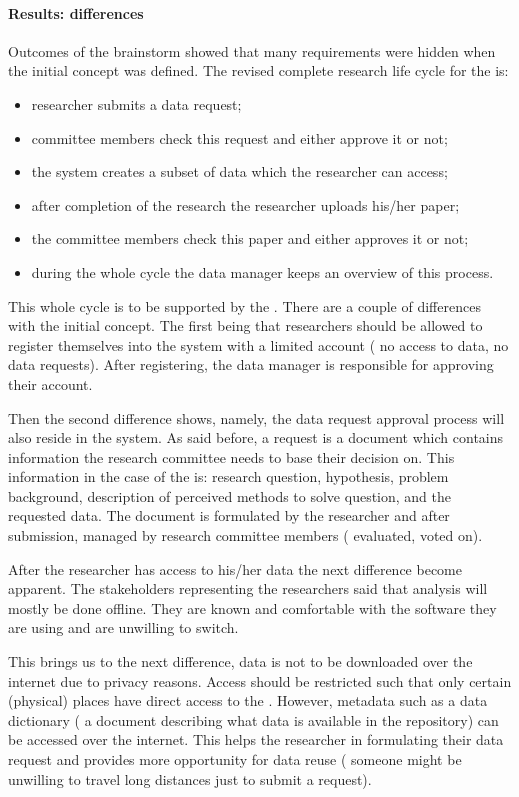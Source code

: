 \paragraph{Results: differences}
Outcomes of the brainstorm showed that many requirements were hidden when the initial concept was defined.
The revised complete research life cycle for the \project{} is:
\begin{itemize}
	\item researcher submits a data request;
	\item committee members check this request and either approve it or not;
	\item the system creates a subset of data which the researcher can access;
	\item after completion of the research the researcher uploads his/her paper;
	\item the committee members check this paper and either approves it or not;
	\item during the whole cycle the data manager keeps an overview of this process.
\end{itemize}

This whole cycle is to be supported by the \ivfsystem{}.
There are a couple of differences with the initial concept.
The first being that researchers should be allowed to register themselves into the system with a limited account (\ie{} no access to data, no data requests).
After registering, the data manager is responsible for approving their account.

Then the second difference shows, namely, the data request approval process will also reside in the system.
As said before, a request is a document which contains information the research committee needs to base their decision on.
This information in the case of the \ivfsystem{} is: research question, hypothesis, problem background, description of perceived methods to solve question, and the requested data.
The document is formulated by the researcher and after submission, managed by research committee members (\ie{} evaluated, voted on).

After the researcher has access to his/her data the next difference become apparent.
The stakeholders representing the researchers said that analysis will mostly be done offline.
They are known and comfortable with the software they are using and are unwilling to switch.

This brings us to the next difference, data is not to be downloaded over the internet due to privacy reasons. 
Access should be restricted such that only certain (physical) places have direct access to the \projectdata{}.
However, metadata such as a data dictionary (\ie{} a document describing what data is available in the repository) can be accessed over the internet.
This helps the researcher in formulating their data request and provides more opportunity for data reuse (\eg{} someone might be unwilling to travel long distances just to submit a request).

